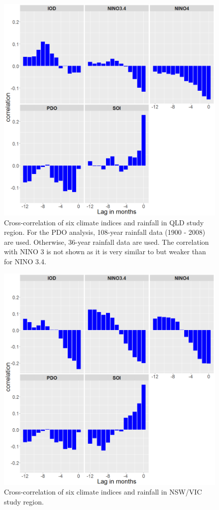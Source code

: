 \documentclass[fleqn,10pt,lineno]{wlpeerj} %
\begin{document}
\begin{figure}
\includegraphics[width=0.9\linewidth]{figures/cor_qld} \caption{Cross-correlation of six climate indices and rainfall in QLD study region. For the PDO analysis, 108-year rainfall data (1900 - 2008) are used. Otherwise, 36-year rainfall data are used. The correlation with NINO 3 is not shown as it is very similar to but weaker than for NINO 3.4.}\label{fig:cor-rain-qld}
\end{figure}

\begin{figure}
\includegraphics[width=0.9\linewidth]{figures/cor_nswvic} \caption{Cross-correlation of six climate indices and rainfall in NSW/VIC study region.}\label{fig:cor-rain-nsw}
\end{figure}
\end{document}
